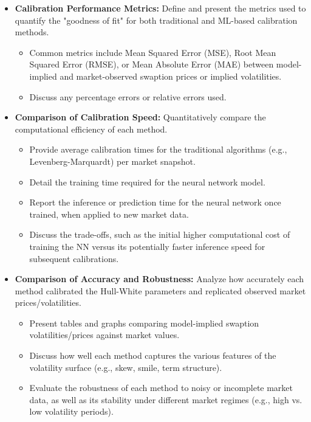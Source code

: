 \begin{itemize}
	\item \textbf{Calibration Performance Metrics:} Define and present the metrics used to quantify the "goodness of fit" for both traditional and ML-based calibration methods.
	      \begin{itemize}
		      \item Common metrics include Mean Squared Error (MSE), Root Mean Squared Error (RMSE), or Mean Absolute Error (MAE) between model-implied and market-observed swaption prices or implied volatilities.
		      \item Discuss any percentage errors or relative errors used.
	      \end{itemize}
	\item \textbf{Comparison of Calibration Speed:} Quantitatively compare the computational efficiency of each method.
	      \begin{itemize}
		      \item Provide average calibration times for the traditional algorithms (e.g., Levenberg-Marquardt) per market snapshot.
		      \item Detail the training time required for the neural network model.
		      \item Report the inference or prediction time for the neural network once trained, when applied to new market data.
		      \item Discuss the trade-offs, such as the initial higher computational cost of training the NN versus its potentially faster inference speed for subsequent calibrations.
	      \end{itemize}
	\item \textbf{Comparison of Accuracy and Robustness:} Analyze how accurately each method calibrated the Hull-White parameters and replicated observed market prices/volatilities.
	      \begin{itemize}
		      \item Present tables and graphs comparing model-implied swaption volatilities/prices against market values.
		      \item Discuss how well each method captures the various features of the volatility surface (e.g., skew, smile, term structure).
		      \item Evaluate the robustness of each method to noisy or incomplete market data, as well as its stability under different market regimes (e.g., high vs. low volatility periods).
	      \end{itemize}

\end{itemize}
